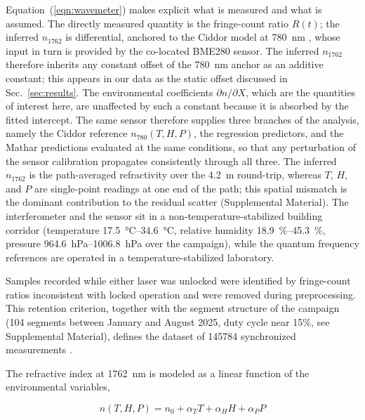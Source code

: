 \documentclass[aps,prapplied,reprint,groupedaddress,twocolumn,superscriptaddress,linenumbers]{revtex4-2}
\begin{document}
Equation~(\ref{eqn:wavemeter}) makes explicit what is measured and what is assumed. The directly measured quantity is the fringe-count ratio $R(t)$; the inferred $n_{1762}$ is differential, anchored to the Ciddor model at \SI{780}{\nano\meter} \cite{ciddor1996refractive}, whose input in turn is provided by the co-located BME280 sensor. The inferred $n_{1762}$ therefore inherits any constant offset of the 780~nm anchor as an additive constant; this appears in our data as the static offset discussed in Sec.~\ref{sec:results}. The environmental coefficients $\partial n/\partial X$, which are the quantities of interest here, are unaffected by such a constant because it is absorbed by the fitted intercept. The same sensor therefore supplies three branches of the analysis, namely the Ciddor reference $n_{780}(T,H,P)$, the regression predictors, and the Mathar predictions evaluated at the same conditions, so that any perturbation of the sensor calibration propagates consistently through all three. The inferred $n_{1762}$ is the path-averaged refractivity over the \SI{4.2}{\meter} round-trip, whereas $T$, $H$, and $P$ are single-point readings at one end of the path; this spatial mismatch is the dominant contribution to the residual scatter (Supplemental Material). The interferometer and the sensor sit in a non-temperature-stabilized building corridor (temperature \SIrange{17.5}{34.6}{\degreeCelsius}, relative humidity \SIrange{18.9}{45.3}{\percent}, pressure \SIrange{964.6}{1006.8}{\hecto\pascal} over the campaign), while the quantum frequency references are operated in a temperature-stabilized laboratory.

Samples recorded while either laser was unlocked were identified by fringe-count ratios inconsistent with locked operation and were removed during preprocessing. This retention criterion, together with the segment structure of the campaign (104 segments between January and August 2025, duty cycle near 15\%, see Supplemental Material), defines the dataset of \num{145784} synchronized measurements \cite{wu_2026_18800166}.

The refractive index at \SI{1762}{\nano\meter} is modeled as a linear function of the environmental variables,

\begin{equation}
n(T,H,P) = n_0 + \alpha_T T + \alpha_H H + \alpha_P P
\end{equation}
\end{document}
